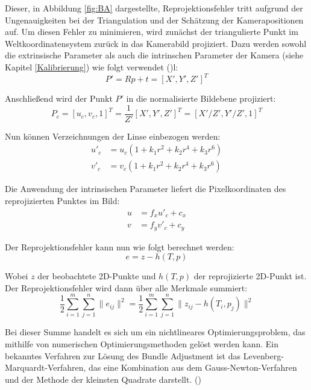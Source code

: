 Dieser, in Abbildung \ref{fig:BA} dargestellte, Reprojektionsfehler tritt aufgrund der Ungenauigkeiten bei der Triangulation und der Schätzung der Kamerapositionen auf. Um diesen Fehler zu minimieren, wird zunächst der triangulierte Punkt im Weltkoordinatensystem zurück in das Kamerabild projiziert. Dazu werden sowohl die extrinsische Parameter als auch die intrinschen Parameter der Kamera (siehe Kapitel \ref{Kalibrierung}) wie folgt verwendet (\cite{gao2021vSLAM})l: 
\begin{equation}
    P' = Rp+t = [X', Y', Z']^T
\end{equation}

Anschließend wird der Punkt \( P' \) in die normalisierte Bildebene projiziert:
\begin{equation}
    P_c = [u_c, v_c, 1]^T = \frac{1}{Z'}[X', Y', Z']^T = [X'/Z', Y'/Z', 1]^T
\end{equation}

Nun können Verzeichnungen der Linse einbezogen werden:
\begin{equation}
    \begin{aligned}
        u'_c &= u_c(1 + k_1r^2 + k_2r^4 + k_3r^6) \\
        v'_c &= v_c(1 + k_1r^2 + k_2r^4 + k_3r^6)
    \end{aligned}
\end{equation}

Die Anwendung der intrinsischen Parameter liefert die Pixelkoordinaten des reprojizierten Punktes im Bild:
\begin{equation}
    \begin{aligned}
        u &= f_xu'_c + c_x \\
        v &= f_yv'_c + c_y
    \end{aligned}
\end{equation}

Der Reprojektionsfehler kann nun wie folgt berechnet werden:
\begin{equation}
    e = z - h(T,p)
\end{equation}

Wobei \( z \) der beobachtete 2D-Punkte und \( h(T,p) \) der reprojizierte 2D-Punkt ist. Der Reprojektionsfehler wird dann über alle Merkmale summiert:
\begin{equation}
    \frac{1}{2} \sum_{i=1}^{m} \sum_{j=1}^{n} \| e_{ij} \|^2 = \frac{1}{2} \sum_{i=1}^{m} \sum_{j=1}^{n} \| z_{ij} - h(T_i, p_j) \|^2
\end{equation}

Bei dieser Summe handelt es sich um ein nichtlineares Optimierungsproblem, das mithilfe von numerischen Optimierungsmethoden gelöst werden kann. Ein bekanntes Verfahren zur Lösung des Bundle Adjustment ist das Levenberg-Marquardt-Verfahren, das eine Kombination aus dem Gauss-Newton-Verfahren und der Methode der kleinsten Quadrate darstellt. (\cite{gao2021vSLAM})

